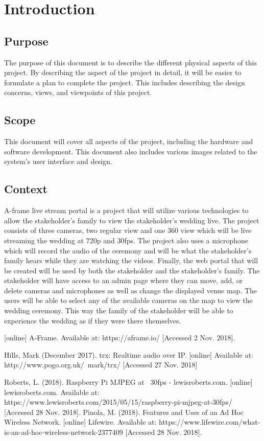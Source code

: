 \documentclass[onecolumn, draftclsnofoot,10pt, compsoc]{IEEEtran}
\begin{document}
\section{Introduction}
    \subsection{Purpose}
    The purpose of this document is to describe the different physical aspects of this project.
    By describing the aspect of the project in detail, it will be easier to formulate a plan to complete the project.
    This includes describing the design concerns, views, and viewpoints of this project.
    
    \subsection{Scope}
    This document will cover all aspects of the project, including the hardware and software development.
    This document also includes various images related to the system's user interface and design.
    
    \subsection{Context}
    A-frame live stream portal is a project that will utilize various technologies to allow the stakeholder's family to view the stakeholder's wedding live.
    The project consists of three cameras, two regular view and one 360 view which will be live streaming the wedding at 720p and 30fps.
    The project also uses a microphone which will record the audio of the ceremony and will be what the stakeholder's family hears while they are watching the videos.
    Finally, the web portal that will be created will be used by both the stakeholder and the stakeholder's family.
    The stakeholder will have access to an admin page where they can move, add, or delete cameras and microphones as well as change the displayed venue map.
    The users will be able to select any of the available cameras on the map to view the wedding ceremony.
    This way the family of the stakeholder will be able to experience the wedding as if they were there themselves.
    
\begin{thebibliography}{}
[online] A-Frame. Available at: https://aframe.io/ [Accessed 2 Nov. 2018].

Hills, Mark (December 2017). trx: Realtime audio over IP.
[online] Available at: http://www.pogo.org.uk/~mark/trx/
[Accessed 27 Nov. 2018]

Roberts, L. (2018). Raspberry Pi MJPEG at ~30fps - lewisroberts.com. [online] lewisroberts.com. Available at: https://www.lewisroberts.com/2015/05/15/raspberry-pi-mjpeg-at-30fps/ [Accessed 28 Nov. 2018].
Pinola, M. (2018). Features and Uses of an Ad Hoc Wireless Network. [online] Lifewire. Available at: https://www.lifewire.com/what-is-an-ad-hoc-wireless-network-2377409 [Accessed 28 Nov. 2018].

\end{thebibliography}
\end{document}
